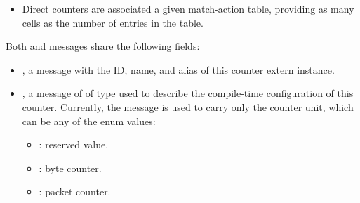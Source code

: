 \documentclass[11pt]{article}
\begin{document}
{\begin{itemize}
\item{}
Direct counters are associated a given match-action table, providing as many
cells as the number of entries in the table.%
\end{itemize}%

\noindent{}Both  and  messages share the following fields:%

\begin{itemize}%

\item{}
, a  message with the ID, name, and alias of this counter
extern instance.%

\item{}
, a message of of type  used to describe the compile-time
configuration of this counter. Currently, the  message is used to
carry only the counter unit, which can be any of the  enum
values:%

\begin{itemize}[noitemsep,topsep=\mdcompacttopsep]%

\item{}: reserved value.%

\item{}: byte counter.%

\item{}: packet counter.%


\end{itemize}
\end{itemize}}
\end{document}
